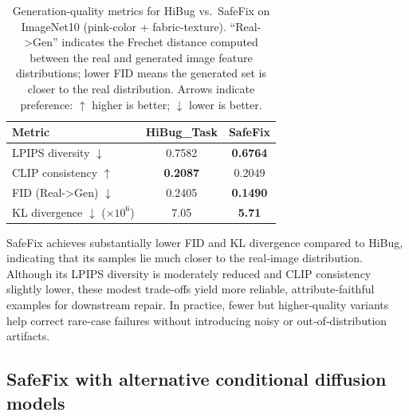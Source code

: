 \documentclass[10pt]{article} %
\newcommand{\model}{SafeFix\xspace}
\newcommand{\hibug}{HiBug\xspace}
\begin{document}
\begin{table}[ht]
  \centering
  \small
  \setlength{\tabcolsep}{8pt}
  \renewcommand{\arraystretch}{1.1}
  \caption{Generation-quality metrics for \hibug{} vs.\ \model{} on ImageNet10 (pink-color + fabric-texture). ``Real->Gen'' indicates the Frechet distance computed between the real and generated image feature distributions; lower FID means the generated set is closer to the real distribution. Arrows indicate preference: $\uparrow$ higher is better; $\downarrow$ lower is better.}
  \label{tab:gen_metrics}
  \begin{tabular}{lcc}
    \toprule
    \textbf{Metric} & \textbf{HiBug\_Task}& \textbf{SafeFix} \\
    \midrule
    LPIPS diversity $\downarrow$    & 0.7582           & \textbf{0.6764}   \\
    CLIP consistency $\uparrow$   & \textbf{0.2087}           & 0.2049   \\
    FID (Real->Gen) $\downarrow$      & 0.2405           & \textbf{0.1490}   \\
    KL divergence $\downarrow$ ($\times10^{6}$) & 7.05               & \textbf{5.71}   \\
    \bottomrule
  \end{tabular}
\end{table}

\model{} achieves substantially lower FID and KL divergence compared to \hibug{}, indicating that its samples lie much closer to the real‐image distribution. Although its LPIPS diversity is moderately reduced and CLIP consistency slightly lower, these modest trade‐offs yield more reliable, attribute‐faithful examples for downstream repair. In practice, fewer but higher‐quality variants help correct rare-case failures without introducing noisy or out‐of‐distribution artifacts.


\subsection{SafeFix with alternative conditional diffusion models}
\end{document}
